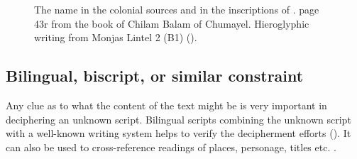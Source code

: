 \documentclass[../main.tex]{subfiles}
\begin{document}
\begin{figure}
    \centering
    \caption[\kakupakal in the colonial sources and inscriptions]
             {The name \kakupakal in the colonial sources and 
             in the inscriptions of \chichenitza.
              page 43r from the book of 
             Chilam Balam of Chumayel.
             Hieroglyphic writing from \chichenitza Monjas Lintel 2 (B1) (\authordrawings).}
\end{figure}

\subsection{Bilingual, biscript, or similar constraint}
Any clue as to what the content of the text might be is very important in deciphering an 
unknown script.
Bilingual scripts combining the unknown script with a well-known writing system helps to
verify the decipherment efforts (\cite[44]{coe1992}).
It can also be used to cross-reference readings of places, personage, titles etc. 
.
\end{document}
